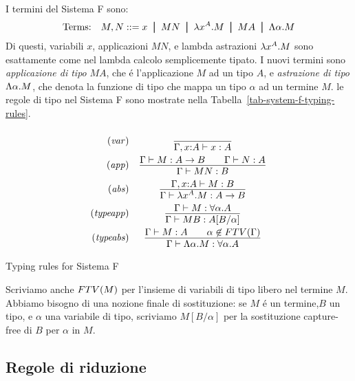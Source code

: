 \documentclass{article}
\begin{document}
I termini del Sistema F sono:
\[ \mbox{Terms:}\ssep M,N \bnf x \bor MN \bor \lamabs{x}{A}.M \bor MA
\bor \Lamabs{\alpha}.M
\]
Di questi, variabili $x$, applicazioni $MN$, e lambda astrazioni
$\lambda x^{A}.M$ sono esattamente come nel lambda
calcolo semplicemente tipato. I nuovi termini sono {\em applicazione di tipo} $MA$, che \'e
l'applicazione $M$ ad un tipo $A$, e {\em astrazione di tipo}
$\Lambda\alpha.M$, che denota la funzione di tipo
che mappa un tipo $\alpha$ ad un  termine $M$. le regole di tipo nel Sistema F
sono mostrate nella Tabella~\ref{tab-system-f-typing-rules}.
\begin{table*}[tbp]
	\[
	\begin{array}{rc}
	\tjvar
	&       \deriv{}{\Gamma,\typ{x}{ A}\tj x: A}
	\nl     \tjapp
	&       \deriv{\Gamma\tj M: A\to B\sep\Gamma\tj N: A}
	{\Gamma\tj MN: B}
	\nl     \tjlam
	&       \deriv{\Gamma,\typ{x}{ A}\tj M: B}
	{\Gamma\tj\lamabs{x}{A}.M: A\to B}
	\nl     \tjApp
	&       \deriv{\Gamma\tj M: \forall\alpha.A}
	{\Gamma\tj MB: A[B/\alpha]}
	\nl     \tjLam
	&       \deriv{\Gamma \tj M: A\sep \alpha\not\in\FTV{\Gamma}}
	{\Gamma\tj\Lamabs{\alpha}.M: \forall\alpha.A}
	\end{array}
	\]
	\caption{Typing rules for Sistema F}
	\label{tab-system-f-typing-rules}
\end{table*}

Scriviamo anche $FTV(M)$ per l'insieme di variabili di tipo libero nel termine
$M$. Abbiamo bisogno di una nozione finale di sostituzione: se  $M$ \'e un termine,$B$ un tipo,
e $\alpha$ una variabile di tipo, scriviamo $M[B/\alpha]$ per la
sostituzione capture-free di $B$ per $\alpha$ in $M$. 

\subsection{Regole di riduzione}
\end{document}
